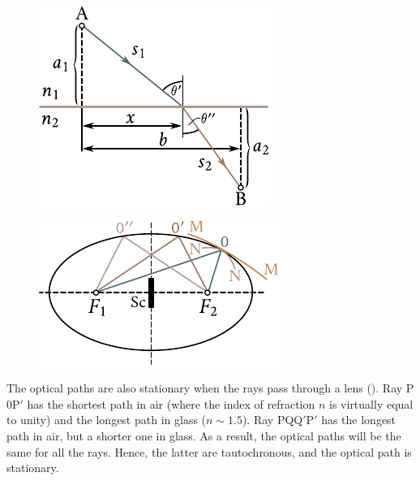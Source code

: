 \begin{figure}[t]
	\begin{minipage}[t]{0.48\linewidth}
		\begin{center}
			\includegraphics[scale=1]{figures/ch_16/fig_16_8.pdf}
			\caption[]{}
			\label{fig:16_8}
		\end{center}
	\end{minipage}
	\hfill{ }%
	\begin{minipage}[t]{0.48\linewidth}
		\begin{center}
			\includegraphics[scale=1]{figures/ch_16/fig_16_9.pdf}
            \caption[]{}
			\label{fig:16_9}
		\end{center}
	\end{minipage}
\vspace{-0.4cm}
\end{figure}

The optical paths are also stationary when the rays pass through a lens ().
Ray P$0$P$'$ has the shortest path in air (where the index of refraction $n$ is virtually equal to unity) and the longest path in glass ($n\sim 1.5$).
Ray PQQ$'$P$'$ has the longest path in air, but a
shorter one in glass.
As a result, the optical paths will be the same for all the rays.
Hence, the latter are tautochronous, and the optical path is stationary.

